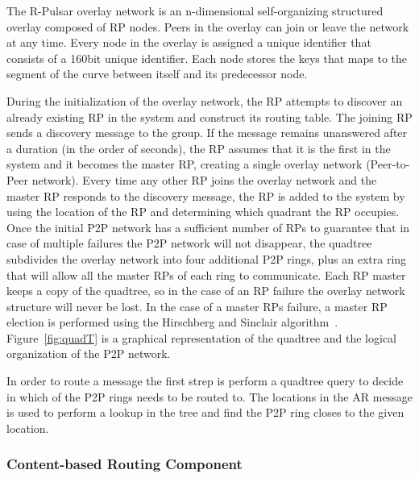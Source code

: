 The R-Pulsar overlay network is an n-dimensional self-organizing structured overlay composed of RP nodes. Peers in the overlay can join or leave the network at any time. Every node in the overlay is assigned a unique identifier that consists of a 160bit unique identifier. Each node stores the keys that maps to the segment of the curve between itself and its predecessor node.

During the initialization of the overlay network, the RP attempts to discover an already existing RP in the system and construct its routing table. The joining RP sends a discovery message to the group. If the message remains unanswered after a duration (in the order of seconds), the RP assumes that it is the first in the system and it becomes the master RP, creating a single overlay network (Peer-to-Peer network). Every time any other RP joins the overlay network and the master RP responds to the discovery message, the  RP is added to the system by using the location of the RP and determining which quadrant the RP occupies. Once the initial P2P network has a sufficient number of RPs to guarantee that in case of multiple failures the P2P network will not disappear, the quadtree subdivides the overlay network into four additional P2P rings, plus an extra ring that will allow all the master RPs of each ring to communicate. Each RP master keeps a copy of the quadtree, so in the case of an RP failure the overlay network structure will never be lost. In the case of a master RPs failure, a master RP election is performed using the Hirschberg and Sinclair algorithm~\cite{Hirschberg}. Figure~\ref{fig:quadT} is a graphical representation of the quadtree and the logical organization of the P2P network.

In order to route a message the first strep is perform a quadtree query to decide in which of the P2P rings needs to be routed to. The locations in the AR message is used to perform a lookup in the tree and find the P2P ring closes to the given location. 

\subsubsection{Content-based Routing Component}\label{sec:frameworkc}

